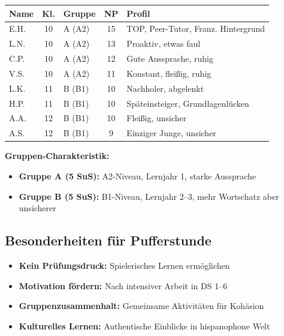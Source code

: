 \documentclass[11pt,a4paper]{article}
\begin{document}
\begin{tabular}{|l|c|l|c|p{4.5cm}|}
\hline
\textbf{Name} & \textbf{Kl.} & \textbf{Gruppe} & \textbf{NP} & \textbf{Profil} \\
\hline
\textcolor{gruppeA}{E.H.} & 10 & \textcolor{gruppeA}{A (A2)} & 15 & TOP, Peer-Tutor, Franz. Hintergrund \\
\hline
\textcolor{gruppeA}{L.N.} & 10 & \textcolor{gruppeA}{A (A2)} & 13 & Proaktiv, etwas faul \\
\hline
\textcolor{gruppeA}{C.P.} & 10 & \textcolor{gruppeA}{A (A2)} & 12 & Gute Aussprache, ruhig \\
\hline
\textcolor{gruppeA}{V.S.} & 10 & \textcolor{gruppeA}{A (A2)} & 11 & Konstant, fleißig, ruhig \\
\hline
\textcolor{gruppeB}{L.K.} & 11 & \textcolor{gruppeB}{B (B1)} & 10 & Nachholer, abgelenkt \\
\hline
\textcolor{gruppeB}{H.P.} & 11 & \textcolor{gruppeB}{B (B1)} & 10 & Späteinsteiger, Grundlagenlücken \\
\hline
\textcolor{gruppeB}{A.A.} & 12 & \textcolor{gruppeB}{B (B1)} & 10 & Fleißig, unsicher \\
\hline
\textcolor{gruppeB}{A.S.} & 12 & \textcolor{gruppeB}{B (B1)} & 9 & Einziger Junge, unsicher \\
\hline
\end{tabular}

\vspace{1em}

\textbf{Gruppen-Charakteristik:}
\begin{itemize}
    \item \textcolor{gruppeA}{\textbf{Gruppe A (5 SuS):}} A2-Niveau, Lernjahr 1, starke Aussprache
    \item \textcolor{gruppeB}{\textbf{Gruppe B (5 SuS):}} B1-Niveau, Lernjahr 2--3, mehr Wortschatz aber unsicherer
\end{itemize}

\subsection{Besonderheiten für Pufferstunde}
\begin{itemize}
    \item \textbf{Kein Prüfungsdruck:} Spielerisches Lernen ermöglichen
    \item \textbf{Motivation fördern:} Nach intensiver Arbeit in DS 1--6
    \item \textbf{Gruppenzusammenhalt:} Gemeinsame Aktivitäten für Kohäsion
    \item \textbf{Kulturelles Lernen:} Authentische Einblicke in hispanophone Welt
\end{itemize}
\end{document}
